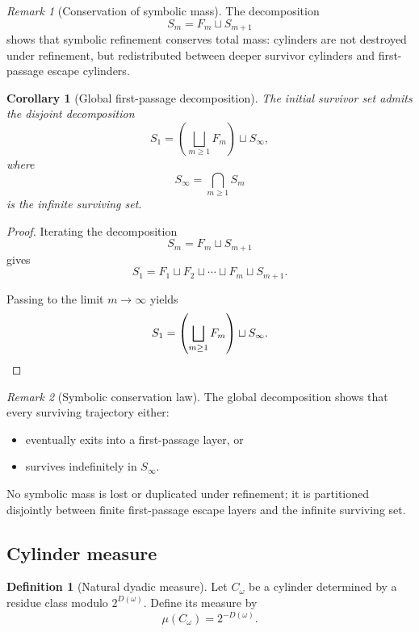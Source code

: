 \documentclass[12pt, oneside]{article}
\numberwithin{equation}{section}
\theoremstyle{definition}
\newtheorem{definition}{Definition}[section]
\theoremstyle{plain}
\newtheorem{corollary}[theorem]{Corollary}
\theoremstyle{remark}
\newtheorem*{remark}{Remark}
\begin{document}
\begin{remark}[Conservation of symbolic mass]
The decomposition
\[
S_m = F_m \sqcup S_{m+1}
\]
shows that symbolic refinement conserves total mass: cylinders are not
destroyed under refinement, but redistributed between deeper survivor
cylinders and first-passage escape cylinders.
\end{remark}

\begin{corollary}[Global first-passage decomposition]
\label{cor:global-decomposition}
The initial survivor set admits the disjoint decomposition
\[
S_1
=
\left(\bigsqcup_{m\ge1} F_m\right)
\sqcup
S_\infty,
\]
where
\[
S_\infty
=
\bigcap_{m\ge1} S_m
\]
is the infinite surviving set.
\end{corollary}

\begin{proof}
Iterating the decomposition
\[
S_m = F_m \sqcup S_{m+1}
\]
gives
\[
S_1
=
F_1 \sqcup F_2 \sqcup \cdots \sqcup F_m \sqcup S_{m+1}.
\]

Passing to the limit \(m\to\infty\) yields
\[
S_1
=
\left(\bigsqcup_{m\ge1}F_m\right)
\sqcup
S_\infty.
\qedhere
\]
\end{proof}

\begin{remark}[Symbolic conservation law]
The global decomposition shows that every surviving trajectory
either:
\begin{itemize}
\item eventually exits into a first-passage layer, or
\item survives indefinitely in \(S_\infty\).
\end{itemize}

No symbolic mass is lost or duplicated under refinement; it is
partitioned disjointly between finite first-passage escape layers
and the infinite surviving set.
\end{remark}

\subsection{Cylinder measure}

\begin{definition}[Natural dyadic measure]
Let \(C_\omega\) be a cylinder determined by a residue class modulo
\(2^{D(\omega)}\). Define its measure by
\[
\mu(C_\omega)
=
2^{-D(\omega)}.
\]
\end{definition}
\end{document}
